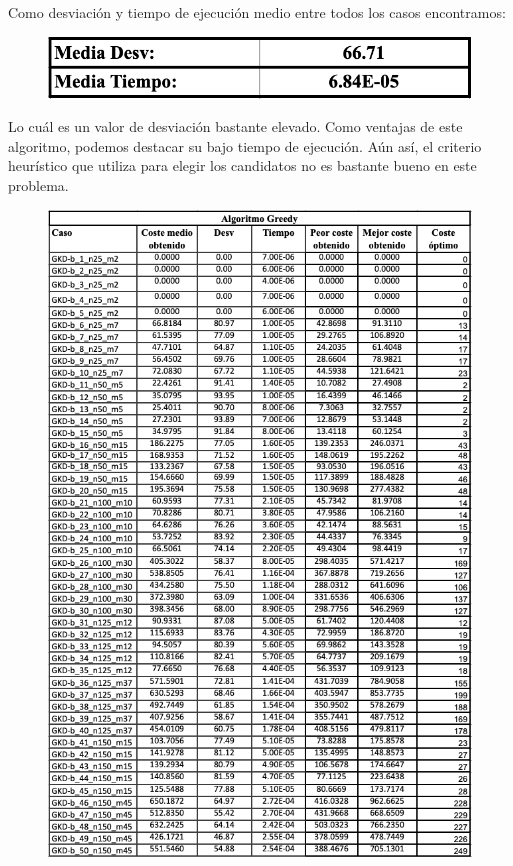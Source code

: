 Como desviación y tiempo de ejecución medio entre todos los casos encontramos:
\begin{figure}[H] %
    \centering
        \includegraphics[scale=0.35]{img/greedy2.png}
\end{figure}

Lo cuál es un valor de desviación bastante elevado. Como ventajas de este algoritmo, podemos destacar su bajo tiempo de ejecución. Aún así, el criterio heurístico que utiliza para elegir los candidatos no es bastante bueno en este problema.

\begin{figure}[H] %
    \centering
        \includegraphics[scale=0.65]{img/greedy.png}
\end{figure}

